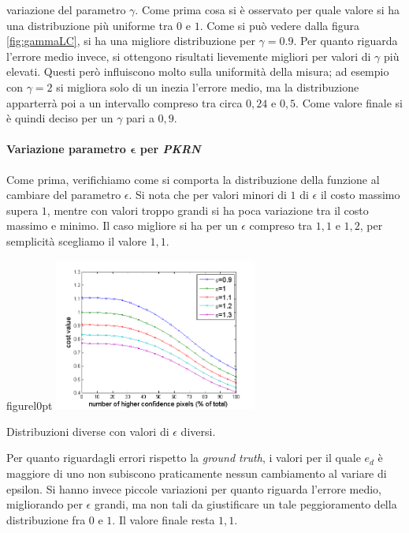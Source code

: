 \documentclass[12pt]{report}
\begin{document}
				\noindent variazione  del parametro $\gamma$. Come prima cosa si è osservato per quale valore si ha una distribuzione più uniforme tra $0$ e $1$. Come si può vedere dalla figura \ref{fig:gammaLC}, si ha una migliore distribuzione per $\gamma=0.9$. Per quanto riguarda l'errore medio invece, si ottengono risultati lievemente migliori per valori di $\gamma$ più elevati. Questi però influiscono molto sulla uniformità della misura; ad esempio con $\gamma=2$ si migliora solo di un inezia l'errore medio, ma la distribuzione apparterrà poi a un intervallo compreso tra circa $0,24$ e $0,5$. Come valore finale si è quindi deciso per un $\gamma$ pari a $0,9$. \newline
		
			\paragraph{Variazione parametro $\bm{\epsilon}$ per \textit{PKRN}}
			\label{par:epsilon}
		
				Come prima, verifichiamo come si comporta la distribuzione della funzione al cambiare del parametro $\epsilon$. Si nota che per valori minori di $1$ di $\epsilon$ il costo massimo supera $1$, mentre con valori troppo grandi si ha poca variazione tra il costo massimo e minimo. Il caso migliore si ha per un $\epsilon$ compreso tra $1,1$ e $1,2$, per semplicità scegliamo il valore $1,1$. 
			
				\begin{wrapfloat}{figure}{l}{0pt}
					\includegraphics[width=0.5\textwidth]{./figures/epsilon_PKRN.png}
					\caption{Distribuzioni diverse con valori di $\epsilon$ diversi.}
					\label{fig:epsilonPKRN}
				\end{wrapfloat} 
			
			
				\noindent Per quanto riguardagli errori rispetto la \textit{ground truth}, i valori per il quale $e_{d}$ è maggiore di uno non  subiscono praticamente nessun cambiamento al variare di epsilon. Si hanno invece piccole variazioni per quanto riguarda l'errore medio, migliorando per $\epsilon$ grandi, ma non tali da giustificare un tale peggioramento della distribuzione fra $0$ e $1$. Il valore finale resta $1,1$. \newline \newline \newline \newline
	
\end{document}
